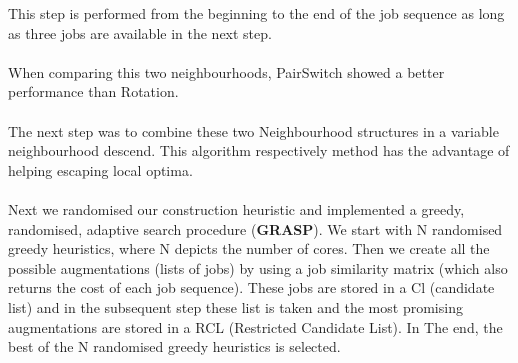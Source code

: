 \documentclass[12pt]{article}
\begin{document}
This step is performed from the beginning to the end of the job sequence as long as
three jobs are available in the next step.
\\
\\
When comparing this two neighbourhoods, PairSwitch showed a better performance than 
Rotation. 
\\
\\
The next step was to combine these two Neighbourhood structures in a variable
neighbourhood descend. This algorithm respectively method has the advantage of
helping escaping local optima. 
\\
\\
Next we randomised our construction heuristic and implemented a greedy, randomised, 
adaptive search procedure (\textbf{GRASP}). We start with N randomised greedy heuristics, where N 
depicts the number of cores. Then we create all the possible augmentations (lists
of jobs) by using a job similarity matrix (which also returns the cost of each
job sequence). These jobs are stored in a Cl (candidate list) and in the subsequent
step these list is taken and the most promising augmentations are stored in a RCL
(Restricted Candidate List). In The end, the best of the N randomised greedy heuristics
is selected.
\end{document}

